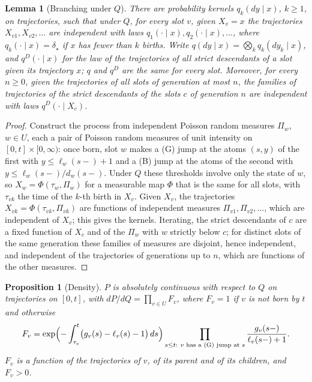 \documentclass[11pt]{article}
\theoremstyle{plain}
\newtheorem{lemma}[theorem]{Lemma}
\newtheorem{proposition}[theorem]{Proposition}
\theoremstyle{definition}
\theoremstyle{remark}
\begin{document}
\begin{lemma}[Branching under $Q$]\label{lem:Q}
There are probability kernels $q_k(dy\mid x)$, $k\ge1$, on trajectories, such that under $Q$, for every slot $v$, given $X_v=x$ the trajectories $X_{v1},X_{v2},\dots$ are independent with laws $q_1(\cdot\mid x),q_2(\cdot\mid x),\dots$, where $q_k(\cdot\mid x)=\delta_\star$ if $x$ has fewer than $k$ births. Write $q(dy\mid x)=\bigotimes_kq_k(dy_k\mid x)$, and $q^D(\cdot\mid x)$ for the law of the trajectories of all strict descendants of a slot given its trajectory $x$; $q$ and $q^D$ are the same for every slot. Moreover, for every $n\ge0$, given the trajectories of all slots of generation at most $n$, the families of trajectories of the strict descendants of the slots $c$ of generation $n$ are independent with laws $q^D(\cdot\mid X_c)$.
\end{lemma}

\begin{proof}
Construct the process from independent Poisson random measures $\Pi_w$, $w\in U$, each a pair of Poisson random measures of unit intensity on $[0,t]\times[0,\infty)$: once born, slot $w$ makes a (G) jump at the atoms $(s,y)$ of the first with $y\le\ell_w(s-)+1$ and a (B) jump at the atoms of the second with $y\le\ell_w(s-)/d_w(s-)$. Under $Q$ these thresholds involve only the state of $w$, so $X_w=\Phi(\tau_w,\Pi_w)$ for a measurable map $\Phi$ that is the same for all slots, with $\tau_{vk}$ the time of the $k$-th birth in $X_v$. Given $X_v$, the trajectories $X_{vk}=\Phi(\tau_{vk},\Pi_{vk})$ are functions of independent measures $\Pi_{v1},\Pi_{v2},\dots$, which are independent of $X_v$; this gives the kernels. Iterating, the strict descendants of $c$ are a fixed function of $X_c$ and of the $\Pi_w$ with $w$ strictly below $c$; for distinct slots of the same generation these families of measures are disjoint, hence independent, and independent of the trajectories of generations up to $n$, which are functions of the other measures.
\end{proof}

\begin{proposition}[Density]\label{prop:density}
$P$ is absolutely continuous with respect to $Q$ on trajectories on $[0,t]$, with $dP/dQ=\prod_{v\in U}F_v$, where $F_v=1$ if $v$ is not born by $t$ and otherwise
\[
F_v=\exp\Bigl(-\int_{\tau_v}^t\bigl(g_v(s)-\ell_v(s)-1\bigr)\,ds\Bigr)\prod_{s\le t:\ v\text{ has a (G) jump at }s}\frac{g_v(s-)}{\ell_v(s-)+1}.
\]
$F_v$ is a function of the trajectories of $v$, of its parent and of its children, and $F_v>0$.
\end{proposition}
\end{document}
